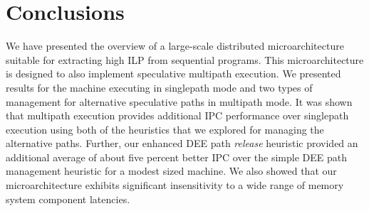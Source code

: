 \documentclass[10pt,dvips]{article}
\begin{document}
\section{Conclusions}
%
We have presented the overview of a large-scale distributed 
microarchitecture suitable for extracting high ILP from
sequential programs.
This microarchitecture is designed to also implement 
speculative multipath execution.  We presented results
for the machine executing in singlepath mode and two types
of management for alternative speculative paths in multipath mode.
It was shown that multipath execution provides additional IPC
performance over singlepath execution using
both of the heuristics that we explored for
managing the alternative paths.
Further, our enhanced DEE path \textit{release} heuristic provided
an additional average of about five percent better IPC over the
simple DEE path management heuristic for a modest sized machine.
We also showed that our microarchitecture exhibits significant
insensitivity to a wide range of memory system component latencies.
%


%
\end{document}
